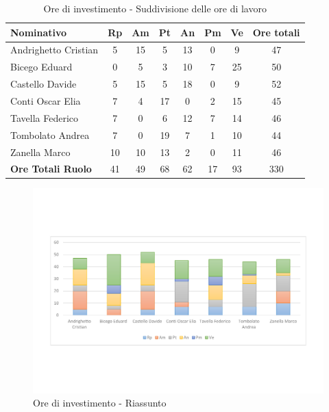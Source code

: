 \documentclass[../PianoProgetto.tex]{subfiles}
\begin{document}
	\begin{table}[h]
		\begin{tabularx}{\textwidth}{l  * {6}{C}  c}
			\toprule
			\textbf{Nominativo} & \textbf{Rp} & \textbf{Am} & \textbf{Pt} 
						& \textbf{An} & \textbf{Pm} & \textbf{Ve} & \textbf{Ore totali} \\
			\midrule
			Andrighetto Cristian & 5 & 15 & 5 & 13 &	0 &	9 &	47 \\
			Bicego Eduard & 0 & 5 & 3 & 10 & 7 & 25 & 50 \\
			Castello Davide & 5 & 15 & 5 & 18 & 0 & 9 & 52 \\
			Conti Oscar Elia & 7 & 4 & 17 & 0 & 2 & 15 & 45 \\
			Tavella Federico &	7 & 0 & 6 & 12 & 7 & 14 & 46 \\
			Tombolato Andrea & 7 & 0 & 19 & 7 & 1 & 10 & 44 \\
			Zanella Marco & 10 & 10 & 13 & 2 & 0 & 11 & 46 \\
			\midrule			
			\textbf{Ore Totali Ruolo} & 41 & 49 & 68 & 62 & 17 & 93 & 330 \\
			\bottomrule
		\end{tabularx}
		\caption{Ore di investimento - Suddivisione delle ore di lavoro}
		\label{tab:investimento_ore}
	\end{table}
\vfill	

	
	\begin{figure}[!h]
		\centering
		\includegraphics[width=\textwidth , trim=2cm 5cm 2cm 5cm]{grafici/Riepilogo/Investimento/ore-persona}
			\caption{Ore di investimento - Riassunto}
		\label{fig:BarChart-investimento_ore}
	\end{figure}
\vfill
\newpage
\vfill	
\end{document}

